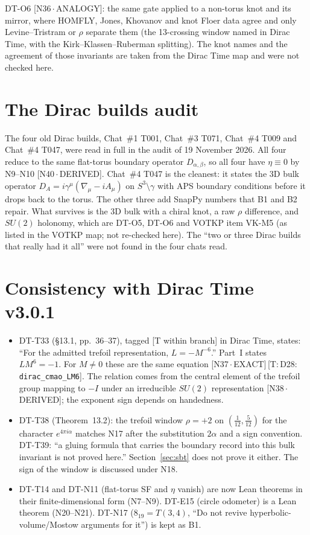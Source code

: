 \documentclass[11pt]{article}
\theoremstyle{definition}
\newcommand{\lean}[1]{\texttt{\small #1}}
\newcommand{\dtag}[1]{#1}
\begin{document}
DT-O6 \dtag{\textsf{\small[N36\,$\cdot$\,ANALOGY]}}: the same gate applied to a non-torus knot and its mirror, where HOMFLY, Jones, Khovanov and knot Floer data agree and only Levine--Tristram or $\rho$ separate them (the 13-crossing window named in Dirac Time, with the Kirk--Klassen--Ruberman splitting). The knot names and the agreement of those invariants are taken from the Dirac Time map and were not checked here.

\section{The Dirac builds audit}
The four old Dirac builds, Chat~\#1 T001, Chat~\#3 T071, Chat~\#4 T009 and Chat~\#4 T047, were read in full in the audit of 19 November 2026. All four reduce to the same flat-torus boundary operator $D_{\alpha,\beta}$, so all four have $\eta\equiv0$ by N9--N10 \dtag{\textsf{\small[N40\,$\cdot$\,DERIVED]}}. Chat~\#4 T047 is the cleanest: it states the 3D bulk operator $D_A=i\gamma^\mu(\nabla_\mu-iA_\mu)$ on $S^3\setminus\gamma$ with APS boundary conditions before it drops back to the torus. The other three add SnapPy numbers that B1 and B2 repair. What survives is the 3D bulk with a chiral knot, a raw $\rho$ difference, and $SU(2)$ holonomy, which are DT-O5, DT-O6 and VOTKP item VK-M5 (as listed in the VOTKP map; not re-checked here). The ``two or three Dirac builds that really had it all'' were not found in the four chats read.

\section{Consistency with Dirac Time v3.0.1}\label{sec:dtcheck}
\begin{itemize}[leftmargin=2em]
\item DT-T33 (\S13.1, pp.~36--37), tagged [T within branch] in Dirac Time, states: ``For the admitted trefoil representation, $L=-M^{-6}$.'' Part~I states $LM^6=-1$. For $M\neq0$ these are the same equation \dtag{\textsf{\small[N37\,$\cdot$\,EXACT]}\,\textsf{\small[T:\,D28:\,\lean{dirac\_\allowbreak{}cmao\_\allowbreak{}LM6}]}}. The relation comes from the central element of the trefoil group mapping to $-I$ under an irreducible $SU(2)$ representation \cite{Klassen} \dtag{\textsf{\small[N38\,$\cdot$\,DERIVED]}}; the exponent sign depends on handedness.
\item DT-T38 (Theorem~13.2): the trefoil window $\rho=+2$ on $(\tfrac1{12},\tfrac5{12})$ for the character $e^{4\pi i\alpha}$ matches N17 after the substitution $2\alpha$ and a sign convention. DT-T39: ``a gluing formula that carries the boundary record into this bulk invariant is not proved here.'' Section~\ref{sec:sbt} does not prove it either. The sign of the window is discussed under N18.
\item DT-T14 and DT-N11 (flat-torus SF and $\eta$ vanish) are now Lean theorems in their finite-dimensional form (N7--N9). DT-E15 (circle odometer) is a Lean theorem (N20--N21). DT-N17 ($8_{19}=T(3,4)$, ``Do not revive hyperbolic-volume/Mostow arguments for it'') is kept as B1.
\end{itemize}
\end{document}
